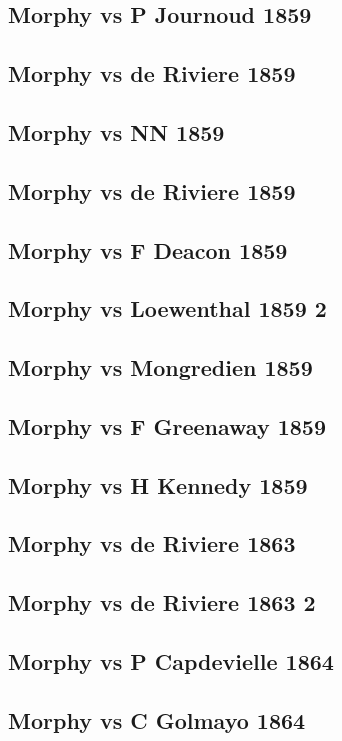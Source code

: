 \documentclass[]{book}
\begin{document}
\subsection{Morphy vs P Journoud 1859}\label{morphy-vs-p-journoud-1859}

\subsection{Morphy vs de Riviere 1859}\label{morphy-vs-de-riviere-1859}

\subsection{Morphy vs NN 1859}\label{morphy-vs-nn-1859}

\subsection{Morphy vs de Riviere
1859}\label{morphy-vs-de-riviere-1859-1}

\subsection{Morphy vs F Deacon 1859}\label{morphy-vs-f-deacon-1859}

\subsection{Morphy vs Loewenthal 1859
2}\label{morphy-vs-loewenthal-1859-2}

\subsection{Morphy vs Mongredien 1859}\label{morphy-vs-mongredien-1859}

\subsection{Morphy vs F Greenaway
1859}\label{morphy-vs-f-greenaway-1859}

\subsection{Morphy vs H Kennedy 1859}\label{morphy-vs-h-kennedy-1859}

\subsection{Morphy vs de Riviere 1863}\label{morphy-vs-de-riviere-1863}

\subsection{Morphy vs de Riviere 1863
2}\label{morphy-vs-de-riviere-1863-2}

\subsection{Morphy vs P Capdevielle
1864}\label{morphy-vs-p-capdevielle-1864}

\subsection{Morphy vs C Golmayo 1864}\label{morphy-vs-c-golmayo-1864}


\end{document}
